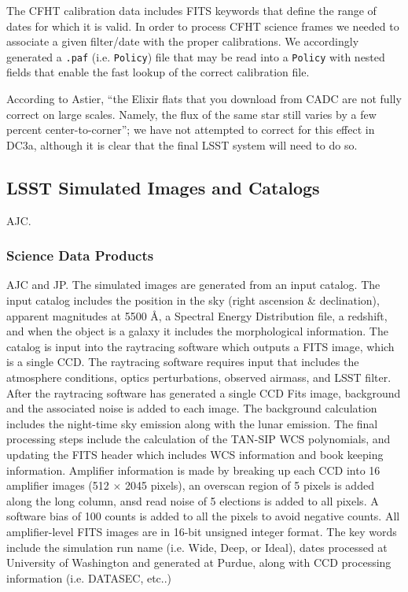 The CFHT calibration data includes FITS keywords that define the range
of dates for which it is valid.  In order to process CFHT science frames
we needed to associate a given filter/date with the proper calibrations.  We
accordingly generated a \texttt{.paf} (i.e. \texttt{Policy}) file that may
be read into a \texttt{Policy} with nested fields that enable the fast
lookup of the correct calibration file.

According to Astier, ``the Elixir flats that you download from CADC
are not fully correct on large scales. Namely, the flux of the same
star still varies by a few percent center-to-corner'';  we have not
attempted to correct for this effect in DC3a,  although it is clear
that the final LSST system will need to do so.

\subsection{LSST Simulated Images and Catalogs}

AJC.

\subsubsection{Science Data Products}
AJC and JP.
The simulated images are generated from an input catalog.  The 
input catalog includes the position in the sky (right ascension \& declination), 
apparent magnitudes at 5500 \AA, a Spectral Energy Distribution file, a
redshift, and when the object is a galaxy it includes the morphological
information.  The catalog is input into the raytracing software which 
outputs a FITS image, which is a single CCD.  The raytracing software requires 
input that includes the atmosphere conditions, optics perturbations, observed
airmass, and LSST filter.  After the raytracing software has generated a 
single CCD Fits image, background and the associated noise is added to 
each image.  The background calculation includes the night-time sky emission 
along with the lunar emission.  The final processing steps include the 
calculation of the TAN-SIP WCS polynomials, and updating the FITS header 
which includes WCS information and book keeping information.  Amplifier
information is made  by breaking up each CCD into 16 amplifier 
images (512 $\times$ 2045 pixels), an overscan region of 5 pixels is added 
along the long column, ansd read noise of 5 elections is added to all pixels.
A software bias of 100 counts is added to all the pixels to avoid negative 
counts.  All amplifier-level FITS images are in 16-bit unsigned integer 
format.  The key words include the simulation run name (i.e. Wide, Deep, 
or Ideal), dates processed at University of Washington and generated at Purdue, 
along with CCD processing information (i.e. DATASEC, etc..) 

